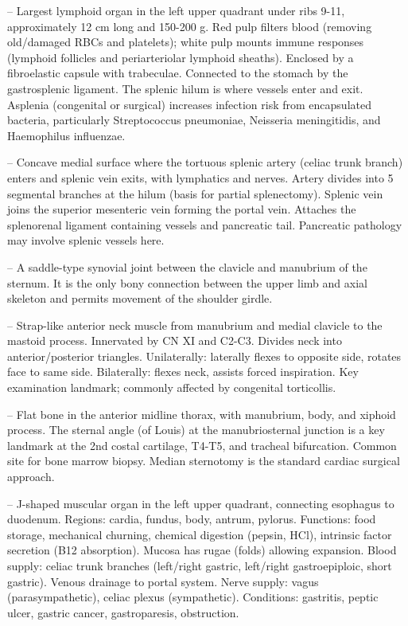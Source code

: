 -- Largest lymphoid organ in the left upper quadrant under ribs 9-11, approximately 12 cm long and 150-200 g. Red pulp filters blood (removing old/damaged RBCs and platelets); white pulp mounts immune responses (lymphoid follicles and periarteriolar lymphoid sheaths). Enclosed by a fibroelastic capsule with trabeculae. Connected to the stomach by the gastrosplenic ligament. The splenic hilum is where vessels enter and exit. Asplenia (congenital or surgical) increases infection risk from encapsulated bacteria, particularly Streptococcus pneumoniae, Neisseria meningitidis, and Haemophilus influenzae.

-- Concave medial surface where the tortuous splenic artery (celiac trunk branch) enters and splenic vein exits, with lymphatics and nerves. Artery divides into 5 segmental branches at the hilum (basis for partial splenectomy). Splenic vein joins the superior mesenteric vein forming the portal vein. Attaches the splenorenal ligament containing vessels and pancreatic tail. Pancreatic pathology may involve splenic vessels here.

-- A saddle-type synovial joint between the clavicle and manubrium of the sternum. It is the only bony connection between the upper limb and axial skeleton and permits movement of the shoulder girdle.

-- Strap-like anterior neck muscle from manubrium and medial clavicle to the mastoid process. Innervated by CN XI and C2-C3. Divides neck into anterior/posterior triangles. Unilaterally: laterally flexes to opposite side, rotates face to same side. Bilaterally: flexes neck, assists forced inspiration. Key examination landmark; commonly affected by congenital torticollis.

-- Flat bone in the anterior midline thorax, with manubrium, body, and xiphoid process. The sternal angle (of Louis) at the manubriosternal junction is a key landmark at the 2nd costal cartilage, T4-T5, and tracheal bifurcation. Common site for bone marrow biopsy. Median sternotomy is the standard cardiac surgical approach.

-- J-shaped muscular organ in the left upper quadrant, connecting esophagus to duodenum. Regions: cardia, fundus, body, antrum, pylorus. Functions: food storage, mechanical churning, chemical digestion (pepsin, HCl), intrinsic factor secretion (B12 absorption). Mucosa has rugae (folds) allowing expansion. Blood supply: celiac trunk branches (left/right gastric, left/right gastroepiploic, short gastric). Venous drainage to portal system. Nerve supply: vagus (parasympathetic), celiac plexus (sympathetic). Conditions: gastritis, peptic ulcer, gastric cancer, gastroparesis, obstruction.

